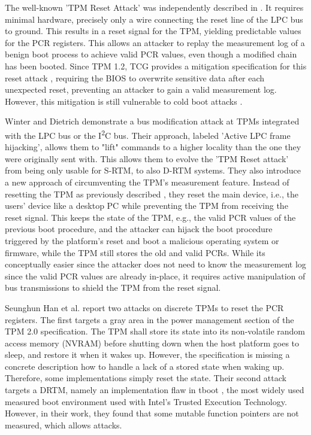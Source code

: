 The well-known 'TPM Reset Attack' was independently described in \cite{kauerBernhard,sparks2007}. It requires minimal hardware, precisely only a wire connecting the reset line of the LPC bus \cite{lpc} to ground. This results in a reset signal for the TPM, yielding predictable values for the \ac{PCR} registers. This allows an attacker to replay the measurement log of a benign boot process to achieve valid \ac{PCR} values, even though a modified chain has been booted.
Since TPM 1.2, TCG provides a mitigation specification for this reset attack \cite{tcgResetFix}, requiring the BIOS to overwrite sensitive data after each unexpected reset, preventing an attacker to gain a valid measurement log.
However, this mitigation is still vulnerable to cold boot attacks \cite{Halderman2009, Winter2013}.

Winter and Dietrich \cite{Winter2013} demonstrate a bus modification attack at TPMs integrated with the LPC bus or the I\textsuperscript{2}C bus.
Their approach, labeled 'Active LPC frame hijacking', allows them to "lift" commands to a higher locality than the one they were originally sent with. This allows them to evolve the 'TPM Reset attack' from being only usable for S-RTM, to also D-RTM systems.
They also introduce a new approach of circumventing the TPM's measurement feature. Instead of resetting the TPM as previously described \cite{kauerBernhard,sparks2007}, they reset the main device, i.e., the users' device like a desktop PC while preventing the TPM from receiving the reset signal. This keeps the state of the TPM, e.g., the valid \ac{PCR} values of the previous boot procedure, and the attacker can hijack the boot procedure triggered by the platform's reset and boot a malicious operating system or firmware, while the TPM still stores the old and valid PCRs. While its conceptually easier since the attacker does not need to know the measurement log since the valid \ac{PCR} values are already in-place, it requires active manipulation of bus transmissions to shield the TPM from the reset signal.

Seunghun Han et al. \cite{aBadDream} report two attacks on discrete TPMs to reset the PCR registers. The first targets a gray area in the power management section of the TPM 2.0 specification. The TPM shall store its state into its non-volatile random access memory (NVRAM) before shutting down when the host platform goes to sleep, and restore it when it wakes up. However, the specification is missing a concrete description how to handle a lack of a stored state when waking up. Therefore, some implementations simply reset the state. Their second attack targets a DRTM, namely an implementation flaw in tboot \cite{tboot}, the most widely used measured boot environment used with Intel's Trusted Execution Technology. However, in their work, they found that some mutable function pointers are not measured, which allows attacks.


